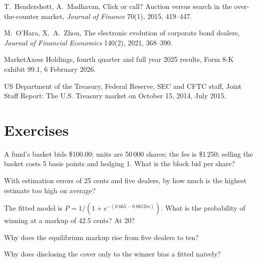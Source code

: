 \begin{omsources}
\item T.~Hendershott, A.~Madhavan, Click or call? Auction versus search in the over-the-counter market, \emph{Journal of Finance} 70(1), 2015,
419--447.
\item M.~O'Hara, X.~A.~Zhou, The electronic evolution of corporate bond dealers, \emph{Journal of Financial Economics} 140(2), 2021, 368--390.
\item MarketAxess Holdings, fourth quarter and full year 2025 results, Form 8-K exhibit 99.1, 6 February 2026.
\item US Department of the Treasury, Federal Reserve, SEC and CFTC staff, Joint Staff Report: The U.S. Treasury market on October 15, 2014, July 2015.
\end{omsources}

\section{Exercises}

\begin{exercise}[$\star$]\label{exo:hf:bond-and-etf-request-for-quote-market-making:1}
A fund's basket bids \$100.00; units are 50\,000 shares; the fee is \$1\,250; selling the basket costs 5 basis points and hedging 1. What is the block
bid per share?
\end{exercise}

\begin{exercise}[$\star$]\label{exo:hf:bond-and-etf-request-for-quote-market-making:2}
With estimation errors of 25 cents and five dealers, by how much is the highest estimate too high on average?
\end{exercise}

\begin{exercise}[$\star$]\label{exo:hf:bond-and-etf-request-for-quote-market-making:3}
The fitted model is $P=1/(1+e^{-(0.665-0.0612m)})$. What is the probability of winning at a markup of 42.5 cents? At 20?
\end{exercise}

\begin{exercise}[$\star\star$]\label{exo:hf:bond-and-etf-request-for-quote-market-making:4}
Why does the equilibrium markup rise from five dealers to ten?
\end{exercise}

\begin{exercise}[$\star\star$]\label{exo:hf:bond-and-etf-request-for-quote-market-making:5}
Why does disclosing the cover only to the winner bias a  fitted naively?
\end{exercise}

